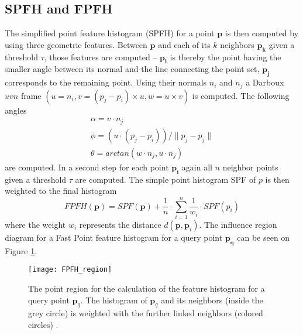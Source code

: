 \subsection{SPFH and FPFH}
The simplified point feature histogram (SPFH) for a point $\boldsymbol{p}$ is then computed by using three geometric features. Between $\boldsymbol{p}$ and each of its $k$ neighbors $\boldsymbol{p_k}$ given a threshold $\tau$, those features are computed -- $\boldsymbol{p_i}$ is thereby the point having the smaller angle between its normal and the line connecting the point set, $\boldsymbol{p_j}$ corresponds to the remaining point. Using their normals $n_i$ and $n_j$ a Darboux $uvn$ frame $(u = n_i, v = (p_j - p_i) \times u, w = u \times v)$ is computed. The following angles
\begin{equation}
\begin{split}
\alpha = v \cdot n_j
\\
\phi = (u \cdot (p_j - p_i))/\|p_j - p_j\|
\\
\theta = arctan(w \cdot n_j, u \cdot n_j)
\end{split}
\label{eq:AngularVariations}
\end{equation}
are computed. In a second step for each point $\boldsymbol{p_i}$ again all $n$ neighbor points given a threshold $\tau$ are computed. The simple point histogram SPF of $p$ is then weighted to the final histogram
\begin{equation}
FPFH(\boldsymbol{p}) = SPF(\boldsymbol{p}) + \frac{1}{n} \cdot \displaystyle\sum_{i=1}^{n}\frac{1}{w_i} \cdot SPF(p_i)
\end{equation}
where the weight $w_i$ represents the distance $d(\boldsymbol{p},\boldsymbol{p}_i)$. The influence region diagram for a Fast Point feature histogram for a query point $\boldsymbol{p_q}$ can be seen on Figure \ref{fig:FPFHregion}. 
\begin{figure}[H]
	\centering
	\texttt{[image: FPFH\_region]}
	\caption{The point region for the calculation of the feature histogram for a query point $\boldsymbol{p}_q$. The histogram of $\boldsymbol{p}_q$ and its neighbors (inside the grey circle) is weighted with the further linked neighbors (colored circles) \cite{FPFH}.}
	\label{fig:FPFHregion}
\end{figure}
